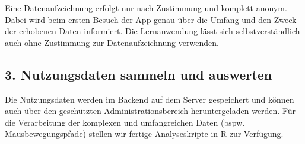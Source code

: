 \documentclass[a0,portrait]{a0poster}
\begin{document}
\begin{multicols}{2}
Eine Datenaufzeichnung erfolgt nur nach Zustimmung und komplett anonym. Dabei wird beim ersten Besuch der App genau über die Umfang und den Zweck der erhobenen Daten informiert. Die Lernanwendung lässt sich selbstverständlich auch ohne Zustimmung zur Datenaufzeichnung verwenden.


\subsection*{3. Nutzungsdaten sammeln und auswerten}

Die Nutzungsdaten werden im Backend auf dem Server gespeichert und können auch über den geschützten Administrationsbereich heruntergeladen werden. Für die Verarbeitung der komplexen und umfangreichen Daten (bspw. Mausbewegungspfade) stellen wir fertige Analyseskripte in R zur Verfügung.




\end{multicols}
\end{document}
